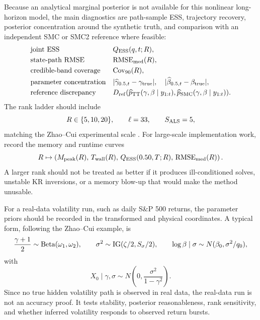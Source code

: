 \documentclass[11pt]{article}
\numberwithin{equation}{section}
\begin{document}
Because an analytical marginal posterior is not available for this nonlinear
long-horizon model, the main diagnostics are path-sample ESS, trajectory
recovery, posterior concentration around the synthetic truth, and comparison
with an independent SMC or SMC2 reference where feasible:
\begin{equation}
\begin{array}{ll}
\text{joint ESS} &
    Q_{\rm ESS}(q,t;R),\\[1mm]
\text{state-path RMSE} &
    {\rm RMSE}_{\rm med}(R),\\[1mm]
\text{credible-band coverage} &
    {\rm Cov}_{90}(R),\\[1mm]
\text{parameter concentration} &
    |\widehat\gamma_{0.5,t}-\gamma_{\rm true}|,
    \quad
    |\widehat\beta_{0.5,t}-\beta_{\rm true}|,\\[1mm]
\text{reference discrepancy} &
    D_{\rm ref}(
    \widehat p_{\rm TT}(\gamma,\beta\mid y_{1:t}),
    \widehat p_{\rm SMC}(\gamma,\beta\mid y_{1:t})).
\end{array}
\label{eq:p27-sv6}
\end{equation}
The rank ladder should include
\begin{equation}
    R\in\{5,10,20\},
    \qquad
    \ell=33,
    \qquad
    S_{\rm ALS}=5,
    \label{eq:p27-sv7}
\end{equation}
matching the Zhao--Cui experimental scale \cite{zhao2024ttsequential}.  For
large-scale implementation work, record the memory and runtime curves
\begin{equation}
    R\mapsto
    \left(
    M_{\rm peak}(R),\,
    T_{\rm wall}(R),\,
    Q_{\rm ESS}(0.50,T;R),\,
    {\rm RMSE}_{\rm med}(R)
    \right).
    \label{eq:p27-sv8}
\end{equation}
A larger rank should not be treated as better if it produces ill-conditioned
solves, unstable KR inversions, or a memory blow-up that would make the method
unusable.

For a real-data volatility run, such as daily S\&P 500 returns, the parameter
priors should be recorded in the transformed and physical coordinates.  A
typical form, following the Zhao--Cui example, is
\begin{equation}
    \frac{\gamma+1}{2}\sim{\rm Beta}(\omega_1,\omega_2),
    \qquad
    \sigma^2\sim{\rm IG}(\zeta/2,S_\sigma/2),
    \qquad
    \log\beta\mid\sigma\sim N(\beta_0,\sigma^2/q_0),
    \label{eq:p27-sv9}
\end{equation}
with
\begin{equation}
    X_0\mid\gamma,\sigma
    \sim
    N\!\left(0,\frac{\sigma^2}{1-\gamma^2}\right).
    \label{eq:p27-sv10}
\end{equation}
Since no true hidden volatility path is observed in real data, the real-data
run is not an accuracy proof.  It tests stability, posterior reasonableness,
rank sensitivity, and whether inferred volatility responds to observed return
bursts.
\end{document}
